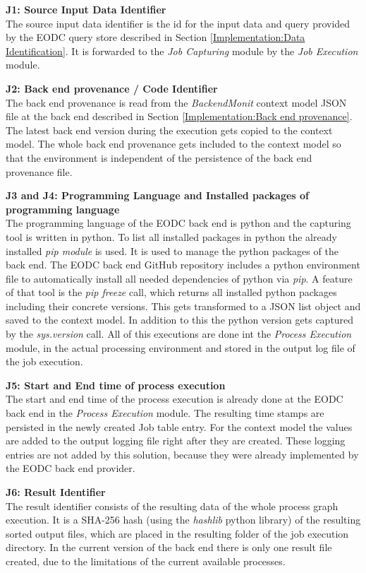 \documentclass[draft,final]{vutinfth} %
\begin{document}
\textbf{J1:  Source Input Data Identifier} \\
The source input data identifier is the id for the input data and query provided by the EODC query store described in Section \ref{Implementation:Data Identification}. It is forwarded to the \textit{Job Capturing} module by the \textit{Job Execution} module. 

\textbf{J2: Back end provenance / Code Identifier} \\
The back end provenance is read from the \textit{BackendMonit} context model JSON file at the back end described in Section \ref{Implementation:Back end provenance}. The latest back end version during the execution gets copied to the context model. The whole back end provenance gets included to the context model so that the environment is independent of the persistence of the back end provenance file. 

\textbf{J3 and J4: Programming Language and  Installed packages of programming language} \\
The programming language of the EODC back end is python and the capturing tool is written in python. To list all installed packages in python the already installed \textit{pip module}  is used. It is used to manage the python packages of the back end. The EODC back end GitHub repository includes a python environment file to automatically install all needed dependencies of python via \textit{pip}. A feature of that tool is the \textit{pip freeze} call, which returns all installed python packages including their concrete versions. This gets transformed to a JSON list object and saved to the context model. In addition to this the python version gets captured by the \textit{sys.version} call. All of this executions are done int the \textit{Process Execution} module, in the actual processing environment and stored in the output log file of the job execution.    

\textbf{J5: Start and End time of process execution} \\
The start and end time of the process execution is already done at the EODC back end in the  \textit{Process Execution} module. The resulting time stamps are persisted in the newly created Job table entry. For the context model the values are added to the output logging file right after they are created. These logging entries are not added by this solution, because they were already implemented by the EODC back end provider.  

\textbf{J6: Result Identifier } \\
The result identifier consists of the resulting data of the whole process graph execution. It is a SHA-256 hash (using the \textit{hashlib} python library) of the resulting sorted output files, which are placed in the resulting folder of the job execution directory. In the current version of the back end there is only one result file created, due to the limitations of the current available processes. 
\end{document}
